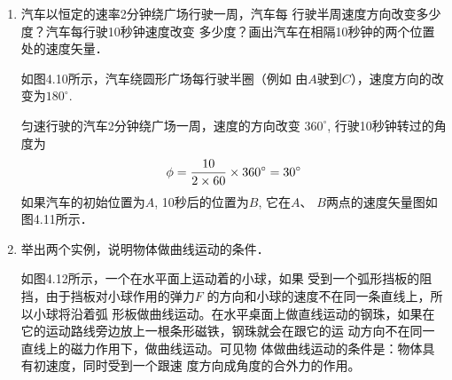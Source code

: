 \begin{enumerate}
\item 汽车以恒定的速率2分钟绕广场行驶一周，汽车每
行驶半周速度方向改变多少度？汽车每行驶10秒钟速度改变
多少度？画出汽车在相隔10秒钟的两个位置处的速度矢量．

\begin{solution}
    如图4.10所示，汽车绕圆形广场每行驶半圈（例如
由$A$驶到$C$），速度方向的改变为$180^{\circ}$.

匀速行驶的汽车2分钟绕广场一周，速度的方向改变
$360^{\circ}$, 行驶10秒钟转过的角度为
\[\phi=\frac{10}{2\times 60}\times 360^{\circ}=30^{\circ}\]
如果汽车的初始位置为$A$, 10秒后的位置为$B$, 它在$A$、
$B$两点的速度矢量图如图4.11所示．
\begin{figure}[htp]\centering
    \begin{minipage}[t]{0.48\textwidth}
    \centering
{}
    \caption{}
    \end{minipage}
    \begin{minipage}[t]{0.48\textwidth}
    \centering
{}
    \caption{}
    \end{minipage}
    \end{figure}

\end{solution}
\item 举出两个实例，说明物体做曲线运动的条件．

\begin{solution}
    如图4.12所示，一个在水平面上运动着的小球，如果
    受到一个弧形挡板的阻挡，由于挡板对小球作用的弹力$F$
的方向和小球的速度不在同一条直线上，所以小球将沿着弧
形板做曲线运动。在水平桌面上做直线运动的钢珠，如果在
它的运动路线旁边放上一根条形磁铁，钢珠就会在跟它的运
动方向不在同一直线上的磁力作用下，做曲线运动。可见物
体做曲线运动的条件是：物体具有初速度，同时受到一个跟速
度方向成角度的合外力的作用。


\end{solution}
\end{enumerate}
